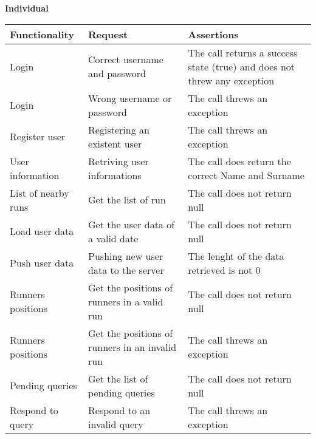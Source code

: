 \noindent\textbf{Individual}
\begin{longtable}{|p{}|p{}|p{}|}
    \hline
    \textbf{Functionality} & \textbf{Request} & \textbf{Assertions} \\
    \hline
    Login & Correct username and password & The call returns a success state (true) and does not threw any exception\\
    \hline
    Login & Wrong username or password & The call threws an exception\\
    \hline
    Register user & Registering an existent user & The call threws an exception\\
    \hline
    User information & Retriving user informations & The call does return the correct Name and Surname\\
    \hline
    List of nearby runs & Get the list of run & The call does not return null\\
    \hline
    Load user data & Get the user data of a valid date & The call does not return null\\
    \hline
    Push user data & Pushing new user data to the server & The lenght of the data retrieved is not 0\\
    \hline
    Runners positions & Get the positions of runners in a valid run & The call does not return null\\
    \hline
    Runners positions & Get the positions of runners in an invalid run & The call threws an exception\\
    \hline
    Pending queries & Get the list of pending queries & The call does not return null\\
    \hline
    Respond to query & Respond to an invalid query & The call threws an exception\\
    \hline
\end{longtable}